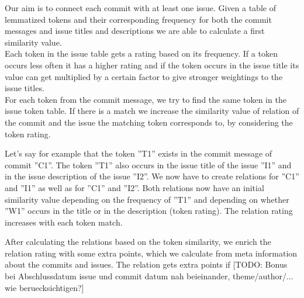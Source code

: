 Our aim is to connect each commit with at least one issue.
Given a table of lemmatized tokens and their corresponding frequency for both the commit messages and issue titles and descriptions we are able to calculate a first similarity value.\\
Each token in the issue table gets a rating based on its frequency.
If a token occurs less often it has a higher rating and if the token occurs in the issue title its value can get multiplied by a certain factor to give stronger weightings to the issue titles.\\
For each token from the commit message, we try to find the same token in the issue token table.
If there is a match we increase the similarity value of relation of the commit and the issue the matching token corresponds to, by considering the token rating.

Let's say for example that the token ''T1'' exists in the commit message of commit ''C1''.
The token ''T1'' also occurs in the issue title of the issue ''I1'' and in the issue description of the issue ''I2''.
We now have to create relations for ''C1'' and ''I1'' as well as for ''C1'' and ''I2''.
Both relations now have an initial similarity value depending on the frequency of ''T1'' and depending on whether ''W1'' occurs in the title or in the description (token rating).
The relation rating increases with each token match.

After calculating the relations based on the token similarity, we enrich the relation rating with some extra points, which we calculate from meta information about the commits and issues.
The relation gets extra points if [TODO: Bonus bei Abschlussdatum issue und commit datum nah beieinander, theme/author/... wie beruecksichtigen?] 